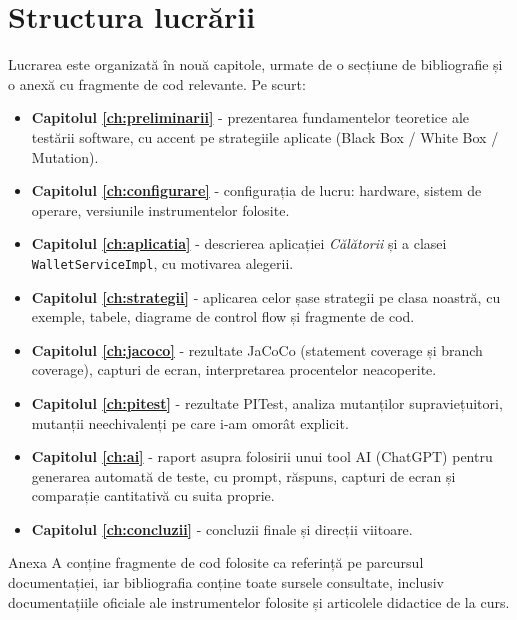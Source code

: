 \section{Structura lucrării}

Lucrarea este organizată în nouă capitole, urmate de o secțiune de bibliografie și o anexă cu fragmente de cod relevante. Pe scurt:

\begin{itemize}
    \item \textbf{Capitolul \ref{ch:preliminarii}} - prezentarea fundamentelor teoretice ale testării software, cu accent pe strategiile aplicate (Black Box / White Box / Mutation).
    \item \textbf{Capitolul \ref{ch:configurare}} - configurația de lucru: hardware, sistem de operare, versiunile instrumentelor folosite.
    \item \textbf{Capitolul \ref{ch:aplicatia}} - descrierea aplicației \textit{Călătorii} și a clasei \texttt{WalletServiceImpl}, cu motivarea alegerii.
    \item \textbf{Capitolul \ref{ch:strategii}} - aplicarea celor șase strategii pe clasa noastră, cu exemple, tabele, diagrame de control flow și fragmente de cod.
    \item \textbf{Capitolul \ref{ch:jacoco}} - rezultate JaCoCo (statement coverage și branch coverage), capturi de ecran, interpretarea procentelor neacoperite.
    \item \textbf{Capitolul \ref{ch:pitest}} - rezultate PITest, analiza mutanților supraviețuitori, mutanții neechivalenți pe care i-am omorât explicit.
    \item \textbf{Capitolul \ref{ch:ai}} - raport asupra folosirii unui tool AI (ChatGPT) pentru generarea automată de teste, cu prompt, răspuns, capturi de ecran și comparație cantitativă cu suita proprie.
    \item \textbf{Capitolul \ref{ch:concluzii}} - concluzii finale și direcții viitoare.
\end{itemize}

Anexa A conține fragmente de cod folosite ca referință pe parcursul documentației, iar bibliografia conține toate sursele consultate, inclusiv documentațiile oficiale ale instrumentelor folosite și articolele didactice de la curs.
